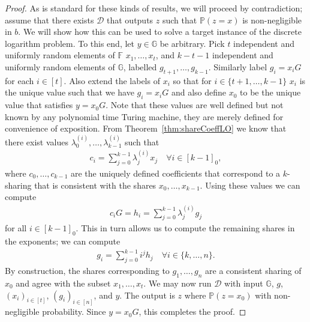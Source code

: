\documentclass{article}
\newcommand{\seq}[1]{\left[#1\right]}
\newcommand{\seqZ}[1]{\left[#1\right]_0}
\theoremstyle{remark}
\newcommand{\F}{\mathbb{F}}
\newcommand{\G}{\mathbb{G}}
\renewcommand{\P}{\mathbb{P}}
\begin{document}
\begin{proof}
	As is standard for these kinds of results, we will proceed by
	contradiction; assume that there exists $\mathcal{D}$ that outputs $z$ such
	that $\P(z = x)$ is non-negligible in $b$. We will show how this can be
	used to solve a target instance of the discrete logarithm problem. To this
	end, let $y \in \G$ be arbitrary. Pick $t$ independent and uniformly random
	elements of $\F$ $x_1, \ldots, x_t$, and $k - t - 1$ independent and
	uniformly random elements of $\G$, labelled $g_{t+1}, \ldots, g_{k-1}$.
	Similarly label $g_i = x_i G$ for each $i \in \seq{t}$. Also extend the
	labels of $x_i$ so that for $i \in \{t+1, \ldots, k-1\}$ $x_i$ is the
	unique value such that we have $g_i = x_i G$ and also define $x_0$ to be
	the unique value that satisfies $y = x_0 G$. Note that these values are
	well defined but not known by any polynomial time Turing machine, they are
	merely defined for convenience of exposition. From
	Theorem~\ref{thm:shareCoeffLO} we know that there exist values
	$\lambda_0^{(i)}, \ldots, \lambda_{k-1}^{(i)}$ such that
	\begin{align*}
		c_i = \sum_{j=0}^{k-1} \lambda_j^{(i)} x_j
		\quad
		\forall i \in \seqZ{k-1},
	\end{align*}
	where $c_0, \ldots, c_{k-1}$ are the uniquely defined coefficients that
	correspond to a $k$-sharing that is consistent with the shares $x_0,
	\ldots, x_{k-1}$. Using these values we can compute
	\begin{align*}
		c_i G = h_i = \sum_{j=0}^{k-1} \lambda_j^{(i)} g_j
	\end{align*}
	for all $i \in \seqZ{k-1}$. This in turn allows us to compute the remaining
	shares in the exponents; we can compute
	\begin{align*}
		g_i = \sum_{j=0}^{k-1} i^j h_j
		\quad
		\forall i \in \{k, \ldots, n\}.
	\end{align*}
	By construction, the shares corresponding to $g_1, \ldots, g_n$ are a
	consistent sharing of $x_0$ and agree with the subset $x_1, \ldots, x_t$.
	We may now run $\mathcal{D}$ with input $\G$, $g$, ${(x_i)}_{i \in
	\seq{t}}$, ${(g_i)}_{i \in \seq{n}}$, and $y$. The output is $z$ where
	$\P(z = x_0)$ with non-negligible probability. Since $y = x_0 G$, this
	completes the proof.
\end{proof}
\end{document}
